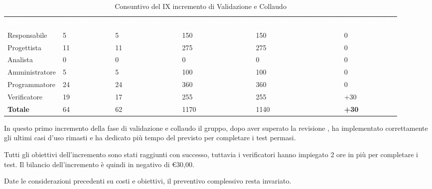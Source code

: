 \begin{table}[H]
\begin{center}
\renewcommand{\arraystretch}{1.5}
\begin{tabular}{ m{}<{\centering}  m{}<{\centering} m{}<{\centering} m{}<{\centering} m{}<{\centering} m{}<{\centering}}
	\rowcolor{darkblue}
	\textcolor{white}{\textbf{Ruolo}} & \textcolor{white}{\textbf{Ore Effettive}} & \textcolor{white}{\textbf{Ore Preventivate}}&\textcolor{white}{\textbf{Costo Effettivo (\euro)}}&\textcolor{white}{\textbf{Costo Preventivato (\euro)}}&\textcolor{white}{\textbf{Differenza (\euro)}}\\ 

	Responsabile  & 5 & 5 & 150 & 150 & 0\\	
	
	Progettista & 11 & 11 & 275 & 275 & 0\\
	
	Analista & 0 & 0 & 0 & 0 & 0\\
	
	Amministratore & 5 & 5 & 100 & 100 & 0\\
	
	Programmatore & 24 & 24 & 360 & 360 & 0\\
	
	Verificatore & 19 & 17 & 255 & 255 & +30\\
	
	\textbf{Totale} & 64 & 62 & 1170 & 1140 & \textbf{+30} \\
	
\end{tabular}
\caption{Consuntivo del IX incremento di Validazione e Collaudo}
\end{center}
\end{table}

In questo primo incremento della fase di validazione e collaudo il gruppo, dopo aver superato la revisione \PB{}, ha implementato correttamente gli ultimi casi d'uso rimasti e ha dedicato più tempo del previsto per completare i test permasi.

Tutti gli obiettivi dell’incremento sono stati raggiunti con successo, tuttavia i verificatori hanno impiegato 2 ore in più per completare i test. Il bilancio dell’incremento è quindi in negativo di \euro30,00. 

Date le considerazioni precedenti su costi e obiettivi, il preventivo complessivo resta invariato.

